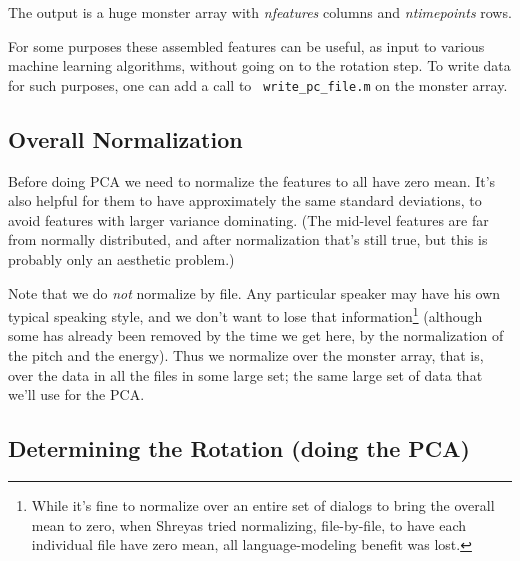 \documentclass[11pt]{article}
\begin{document}
The output is a huge monster array with {\it nfeatures} columns and
{\it ntimepoints} rows.

For some purposes these assembled features can be useful, as input to
various machine learning algorithms, without going on to the rotation
step.  To write data for such purposes, one can add a call to {\tt
  write\_pc\_file.m} on the monster array.


\subsection{Overall Normalization}

Before doing PCA we need to normalize the features to all have zero
mean.  It's also helpful for them to have approximately the same
standard deviations, to avoid features with larger variance
dominating.  (The mid-level features are far from normally
distributed, and after normalization that's still true, but this is
probably only an aesthetic  problem.)



Note that we do {\em not} normalize by file.  Any particular speaker
may have his own typical speaking style, and we don't want to lose
that information\footnote{While it's fine to normalize over an entire
  set of dialogs to bring the overall mean to zero, when Shreyas tried
  normalizing, file-by-file, to have each individual file have zero
  mean, all language-modeling benefit was lost.}  (although some has
already been removed by the time we get here, by the normalization of
the pitch and the energy).  Thus we normalize over the monster array, that
is, over the data in all the files in some large set; the same large
set of data that we'll use for the PCA.


\subsection{Determining the Rotation (doing the PCA)}   \label{rotating}
\end{document}

